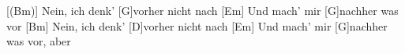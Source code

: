 \begin{guitar}
	[(Bm)] Nein, ich denk' [G]vorher nicht nach
	[Em] Und mach' mir [G]nachher was vor
	[Bm] Nein, ich denk' [D]vorher nicht nach
	[Em] Und mach' mir [G]nachher was vor, aber
	
	\begin{highlightbar}
		 
	\end{highlightbar}
	
\end{guitar}